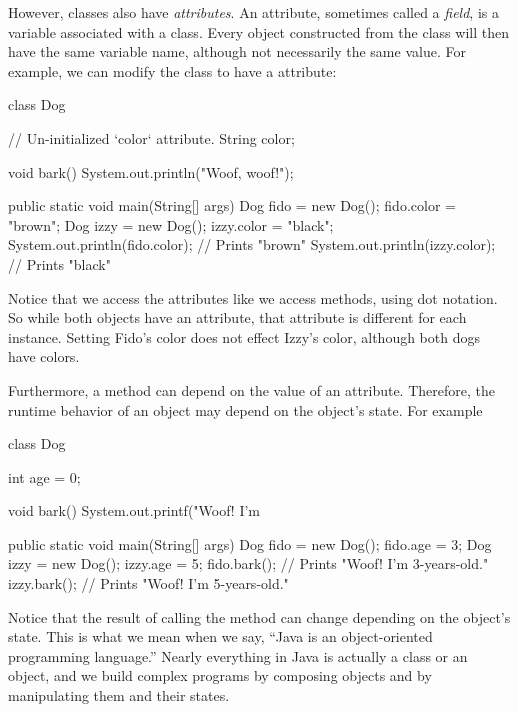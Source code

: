 However, classes also have \emph{attributes}. An attribute, sometimes called a \emph{field}, is a variable associated with a class. Every object constructed from the class will then have the same variable name, although not necessarily the same value. For example, we can modify the  class to have a  attribute:

\begin{code}
class Dog {

    // Un-initialized `color` attribute.
    String color;

    void bark() {
        System.out.println("Woof, woof!");
    }
    
    public static void main(String[] args) {
        Dog fido = new Dog();
        fido.color = "brown";
        Dog izzy = new Dog();
        izzy.color = "black";
        System.out.println(fido.color);  // Prints "brown"
        System.out.println(izzy.color);  // Prints "black"
    }
}
\end{code}

Notice that we access the attributes like we access methods, using dot notation. So while both  objects have an  attribute, that attribute is different for each instance. Setting Fido's color does not effect Izzy's color, although both dogs have colors.

Furthermore, a method can depend on the value of an attribute. Therefore, the runtime behavior of an object may depend on the object's state. For example

\begin{code}
class Dog {

    int age = 0;
    
    void bark() {
        System.out.printf("Woof! I'm %
    }
    
    public static void main(String[] args) {
        Dog fido = new Dog();
        fido.age = 3;
        Dog izzy = new Dog();
        izzy.age = 5;
        fido.bark();  // Prints "Woof! I'm 3-years-old."
        izzy.bark();  // Prints "Woof! I'm 5-years-old."
    }
}
\end{code}

Notice that the result of calling the method  can change depending on the object's state.  This is what we mean when we say, ``Java is an object-oriented programming language.'' Nearly everything in Java is actually a class or an object, and we build complex programs by composing objects and by manipulating them and their states.

